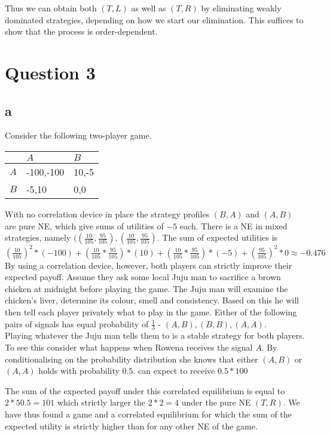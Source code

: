 \documentclass[10pt,a4paper]{article}
\begin{document}
Thus we can obtain both $(T,L)$ as well as $(T,R)$ by eliminating weakly dominated strategies, depending on how we start our elimination. This suffices to show that the process is order-dependent.

\section*{Question 3}
\subsection*{a}
Consider the following two-player game.
\begin{table}[h]
\begin{tabular}{|l|l|l|}
\hline
          & $A$ & $B$  \\ \hline
$A$     & -100,-100   & 10,-5 \\ \hline
$B$     & -5,10 & 0,0  \\ \hline
\end{tabular}
\end{table}

With no correlation device in place the strategy profiles $(B,A)$ and $(A,B)$ are pure NE, which give sums of utilities of $-5$ each. There is a NE in mixed strategies, namely $((\tfrac{10}{105},\tfrac{95}{105}),(\tfrac{10}{105},\tfrac{95}{105})$. The sum of expected utilities is $(\tfrac{10}{105})^2*(-100)+(\tfrac{10}{105}*\tfrac{95}{105})*(10)+(\tfrac{10}{105}*\tfrac{95}{105})*(-5)+(\tfrac{95}{105})^2*0\approx -0.476$
By using a correlation device, however, both players can strictly improve   their expected payoff. Assume they ask some local Juju man to sacrifice a brown chicken at midnight before playing the game. The Juju man will examine the chicken's liver, determine its colour, smell and consistency. Based on this he will then tell each player privately what to play in the game. Either of the following pairs of signals has equal probability of $\tfrac{1}{3}$ - $(A,B),(B,B),(A,A)$.\\
Playing whatever the Juju man tells them to is a stable strategy for both players. To see this consider what happens when Rowena receives the signal $A$. By conditionalising on the probability distribution she knows that either $(A,B)$ or $(A,A)$ holds with probability $0.5$. can expect to receive $0.5*100$

The sum of the expected payoff under this correlated equilibrium is equal to $2*50.5=101$ which strictly larger the $2*2=4$ under the pure NE $(T,R)$. We have thus found a game and a correlated equilibrium for which the sum of the expected utility is strictly higher than for any other NE of the game.
\end{document}
